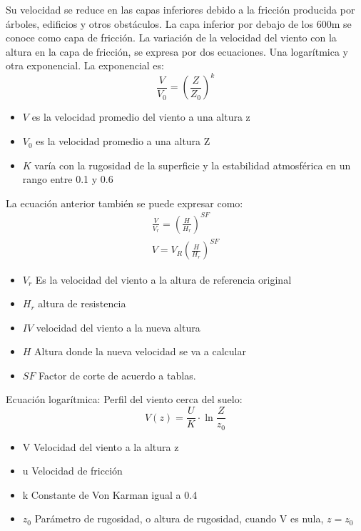     Su velocidad se reduce en las capas inferiores debido a la fricción producida por árboles, edificios y otros obstáculos. La capa inferior por debajo de los 600m se conoce como capa de fricción. La variación de la velocidad del viento con la altura en la capa de fricción, se expresa por dos ecuaciones. Una logarítmica y otra exponencial. La exponencial es:
    \begin{equation}
        \frac{V}{V_0} = \left(\frac{Z}{Z_0}\right)^{k}
    \end{equation}
    \begin{notation}
        \begin{itemize}
            \item $V$ es la velocidad promedio del viento a una altura z
            \item $V_0$ es la velocidad promedio a una altura Z
            \item $K$ varía con la rugosidad de la superficie y la estabilidad atmosférica en un rango entre 0.1 y 0.6
        \end{itemize}
    \end{notation}
    La ecuación anterior también se puede expresar como:
    \begin{align*}
        \frac{V}{V_r}=\left(\frac{H}{H_r} \right)^{SF}\\
        V=V_R\left(\frac{H}{H_r}\right)^{SF}
    \end{align*}
    \begin{notation}
    \begin{itemize}
        \item $V_r$ Es la velocidad del viento a la altura de referencia original 
        \item $H_r$ altura de resistencia
        \item $IV$ velocidad del viento a la nueva altura
        \item $H$ Altura donde la nueva velocidad se va a calcular
        \item $SF$ Factor de corte de acuerdo a tablas.
    \end{itemize}
    \end{notation}
    Ecuación logarítmica: Perfil del viento cerca del suelo:
    \begin{equation}
        V(z) = \frac{U}{K}\cdot\ln{\frac{Z}{z_0}}
    \end{equation}
    \begin{notation}
        \begin{itemize}
            \item V Velocidad del viento a la altura z
            \item u Velocidad de fricción
            \item k Constante de Von Karman igual a 0.4
            \item $z_0$ Parámetro de rugosidad, o altura de rugosidad, cuando V es nula, $z=z_0$
        \end{itemize}
    \end{notation}
